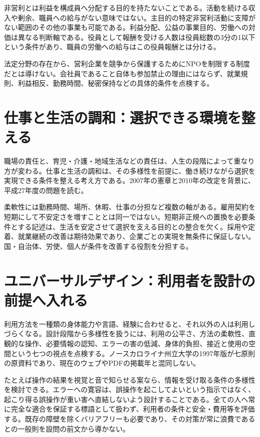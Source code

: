 非営利とは利益を構成員へ分配する目的を持たないことである。活動を続ける収入や剰余、職員への給与がない意味ではない。主目的の特定非営利活動に支障がない範囲のその他の事業も可能である。利益分配、公益の事業目的、労働への対価は異なる判断軸である。役員として報酬を受ける人数は役員総数の3分の1以下という条件があり、職員の労働への給与はこの役員報酬とは分ける\parencite{cabinet_npo_officers}。

法定分野の存在から、営利企業を競争から保護するためにNPOを制限する制度だとは導けない。会社員であること自体も参加禁止の理由にはならず、就業規則、利益相反、勤務時間、秘密保持などの具体的条件を点検する。

\section{仕事と生活の調和：選択できる環境を整える}
\label{theory:ethics:worklife}
職場の責任と、育児・介護・地域生活などの責任は、人生の段階によって重なり方が変わる。仕事と生活の調和は、その多様性を前提に、働き続けながら選択を実現できる条件を整える考え方である。2007年の憲章と2010年の改定を背景に、平成27年度の問題を読む\parencite{cabinet_worklife}。

柔軟性には勤務時間、場所、休暇、仕事の分担など複数の軸がある。雇用契約を短期にして不安定さを増すこととは同一ではない。短期非正規への置換を必要条件とする記述は、生活を安定させて選択を支える目的との整合を欠く。採用や定着、就業継続の改善は期待効果であり、企業ごとの実現を無条件に保証しない。国・自治体、労使、個人が条件を改善する役割を分担する。

\section{ユニバーサルデザイン：利用者を設計の前提へ入れる}
\label{theory:ethics:universal}
利用方法を一種類の身体能力や言語、経験に合わせると、それ以外の人は利用しづらくなる。設計段階から多様性を扱うには、利用の公平さ、方法の柔軟性、直観的な操作、必要情報の認知、エラーの害の低減、身体的負担、接近と使用の空間という七つの視点を点検する。ノースカロライナ州立大学の1997年版が七原則の原資料であり、現在のウェブやPDFの掲載年と混同しない\parencite{ncsu_ud1997}。

たとえば操作の結果を視覚と音で知らせる案なら、情報を受け取る条件の多様性を検討できる。エラーへの寛容は、誤操作を起こしてよいという指示ではなく、起こり得る誤操作が重い害へ直結しないよう設計することである。全ての人へ常に完全な適合を保証する標語として扱わず、利用者の条件と安全・費用等を評価する。既存の障壁を除くバリアフリーも必要であり、その対策が常に浪費であるとの一般則を設問の前文から導かない。

